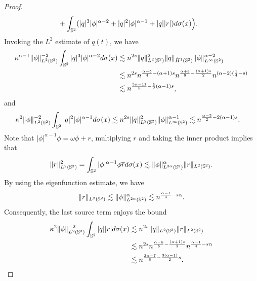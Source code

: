 \documentclass[11pt, reqno]{amsart}
\numberwithin{equation}{section}
\theoremstyle{definition}
\theoremstyle{remark}
\begin{document}
{\begin{proof}
\begin{equation*}
\begin{aligned}
&+ \int_{\Bbb S^2}(|q|^3|\phi|^{\alpha-2}+|q|^2|\phi|^{\alpha-1}+|q||r|)d\sigma(x)\Big).
\end{aligned}
\end{equation*}
Invoking the $L^2$ estimate of $q(t)$, we have
\begin{equation*}
\begin{aligned}
\kappa^{\alpha-1}\|\phi\|^{-2}_{L^2(\Bbb S^2)}\int_{\Bbb S^2}|q|^3|\phi|^{\alpha-2}d\sigma(x) &\lesssim n^{2s}\|q\|^{2}_{L^2(\Bbb S^2)}\|q\|_{\dot{H}^1(\Bbb S^2)}\|\phi\|^{\alpha-2}_{L^\infty(\Bbb S^2)}\\
&\lesssim n^{2s} n^{\frac{\alpha-5}{4}-(\alpha+1)s}n^{\frac{\alpha+3}{8}-\frac{(\alpha+1)s}{2}}n^{(\alpha-2)(\frac{1}{4}-s)}\\
&\lesssim n^{\frac{5\alpha-11}{8}-\frac{5}{2}(\alpha-1)s},
\end{aligned}
\end{equation*}
and
\begin{equation*}
\begin{aligned}
\kappa^2\|\phi\|^{-2}_{L^2(\Bbb S^2)}\int_{\Bbb S^2}|q|^2|\phi|^{\alpha-1}d\sigma(x) &\lesssim n^{2s}\|q\|^2_{L^2(\Bbb S^2)}\|\phi\|^{\alpha-1}_{L^\infty(\Bbb S^2)}
\lesssim n^{\frac{\alpha-3}{2}-2(\alpha-1)s}. 
\end{aligned}
\end{equation*} 
Note that $|\phi|^{\alpha-1}\phi = \omega\phi+r$, multiplying $r$ and taking the  inner product implies that
\begin{equation*}
\|r\|^2_{L^2(\Bbb S^2)} = \int_{\Bbb S^2} |\phi|^{\alpha-1}\phi \overline{r} d\sigma(x) \lesssim \|\phi\|^\alpha_{L^{2\alpha}(\Bbb S^2)} \|r\|_{L^2(\Bbb S^2)}.
\end{equation*}
By using the eigenfunction estimate, we have 
\begin{equation*}
\|r\|_{L^2(\Bbb S^2)} \lesssim \|\phi\|^\alpha_{L^{2\alpha}(\Bbb S^2)} \lesssim n^{\frac{\alpha-1}{4}-s\alpha}.
\end{equation*}
Consequently, the last source term enjoys the bound
\begin{equation*}
\begin{aligned}
\kappa^2\|\phi\|^{-2}_{L^2(\Bbb S^2)}\int_{\Bbb S^2}|q||r|d\sigma(x) &\lesssim n^{2s}\|q\|_{L^2(\Bbb S^2)}\|r\|_{L^2(\Bbb S^2)}\\
&\lesssim n^{2s}n^{\frac{\alpha-5}{8}-\frac{(\alpha+1)s}{2}}n^{\frac{\alpha-1}{4}-s\alpha}\\
&\lesssim n^{\frac{3\alpha-7}{8}-\frac{3(\alpha-1)}{2}s}. 
\end{aligned}

\end{equation*}
\end{proof}}
\end{document}
